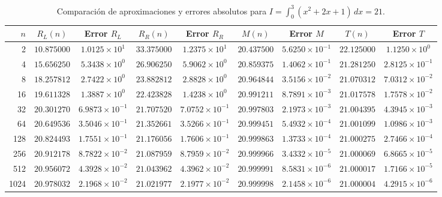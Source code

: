 \documentclass[11pt,a4paper]{article}
\begin{document}
\begin{table}[h!]
\centering
\caption{Comparación de aproximaciones y errores absolutos para $I = \int_0^3 (x^2 + 2x + 1)\, dx = 21$.}
\label{tab:ejercicio1_errores}
\footnotesize
\begin{tabular}{rcccccccc}
\toprule
$n$ & $R_L(n)$ & Error $R_L$ & $R_R(n)$ & Error $R_R$ & $M(n)$ & Error $M$ & $T(n)$ & Error $T$ \\
\midrule
2   & $10.875000$ & $1.0125\times 10^{1}$ & $33.375000$ & $1.2375\times 10^{1}$ & $20.437500$ & $5.6250\times 10^{-1}$ & $22.125000$ & $1.1250\times 10^{0}$ \\
4   & $15.656250$ & $5.3438\times 10^{0}$ & $26.906250$ & $5.9062\times 10^{0}$ & $20.859375$ & $1.4062\times 10^{-1}$ & $21.281250$ & $2.8125\times 10^{-1}$ \\
8   & $18.257812$ & $2.7422\times 10^{0}$ & $23.882812$ & $2.8828\times 10^{0}$ & $20.964844$ & $3.5156\times 10^{-2}$ & $21.070312$ & $7.0312\times 10^{-2}$ \\
16  & $19.611328$ & $1.3887\times 10^{0}$ & $22.423828$ & $1.4238\times 10^{0}$ & $20.991211$ & $8.7891\times 10^{-3}$ & $21.017578$ & $1.7578\times 10^{-2}$ \\
32  & $20.301270$ & $6.9873\times 10^{-1}$ & $21.707520$ & $7.0752\times 10^{-1}$ & $20.997803$ & $2.1973\times 10^{-3}$ & $21.004395$ & $4.3945\times 10^{-3}$ \\
64  & $20.649536$ & $3.5046\times 10^{-1}$ & $21.352661$ & $3.5266\times 10^{-1}$ & $20.999451$ & $5.4932\times 10^{-4}$ & $21.001099$ & $1.0986\times 10^{-3}$ \\
128 & $20.824493$ & $1.7551\times 10^{-1}$ & $21.176056$ & $1.7606\times 10^{-1}$ & $20.999863$ & $1.3733\times 10^{-4}$ & $21.000275$ & $2.7466\times 10^{-4}$ \\
256 & $20.912178$ & $8.7822\times 10^{-2}$ & $21.087959$ & $8.7959\times 10^{-2}$ & $20.999966$ & $3.4332\times 10^{-5}$ & $21.000069$ & $6.8665\times 10^{-5}$ \\
512 & $20.956072$ & $4.3928\times 10^{-2}$ & $21.043962$ & $4.3962\times 10^{-2}$ & $20.999991$ & $8.5831\times 10^{-6}$ & $21.000017$ & $1.7166\times 10^{-5}$ \\
1024& $20.978032$ & $2.1968\times 10^{-2}$ & $21.021977$ & $2.1977\times 10^{-2}$ & $20.999998$ & $2.1458\times 10^{-6}$ & $21.000004$ & $4.2915\times 10^{-6}$ \\
\bottomrule
\end{tabular}
\end{table}
\end{document}
